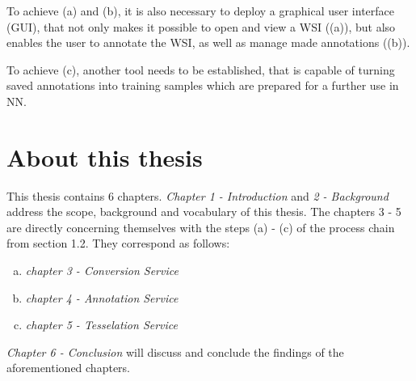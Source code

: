 To achieve (a) and (b), it is also necessary to deploy a graphical user interface (GUI), that not only makes it possible to open and view a WSI ((a)), but also enables the user to annotate the WSI, as well as manage made annotations ((b)).

To achieve (c), another tool needs to be established, that is capable of turning saved annotations into training samples which are prepared for a further use in NN.


\section{About this thesis}
This thesis contains 6 chapters. \emph{Chapter 1 - Introduction} and \emph{2 - Background} address the scope, background and vocabulary of this thesis. The chapters 3 - 5 are directly concerning themselves with the steps (a) - (c) of the process chain from section 1.2. They correspond as follows:
\begin{enumerate}[(a):]
	\item \emph{chapter 3 - Conversion Service}
	\item \emph{chapter 4 - Annotation Service}
	\item \emph{chapter 5 - Tesselation Service}
\end{enumerate}
\emph{Chapter 6 - Conclusion} will discuss and conclude the findings of the aforementioned chapters.